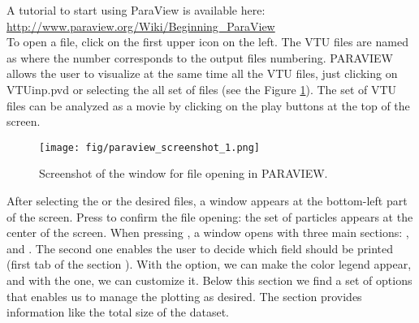 A tutorial to start using ParaView is available here:\\
\url{http://www.paraview.org/Wiki/Beginning_ParaView}\\

To open a file, click on the first upper icon on the left. 
The VTU files are named as  where the number corresponds to
the output files numbering. 
PARAVIEW allows the user to visualize at the same time all the VTU files, 
just clicking on VTUinp.pvd or selecting the all set of  files
(see the Figure \ref{fig:paraview_screenshot_1}).
The set of VTU files can be analyzed as a movie by clicking on 
the play buttons at the top of the screen. 

\begin{figure}[h]
  \begin{center}
    \texttt{[image: fig/paraview\_screenshot\_1.png]}
    \caption{Screenshot of the window for file opening in PARAVIEW.}\label{fig:paraview_screenshot_1}   
  \end{center}
\end{figure}
After selecting the  or the desired  files, 
a window appears at the bottom-left part of the screen. 
Press  to confirm the file opening: the set of particles
appears at the center of the screen.
When pressing , a window opens with three main sections: 
,  and . 
The second one enables the user to decide which field should be printed 
(first tab of the section ). 
With the  option, we can make the color legend appear, 
and with the  one, we can customize it. 
Below this section we find a set of options that enables us to manage the plotting as desired.
The  section provides information like the total size of the dataset.\\

